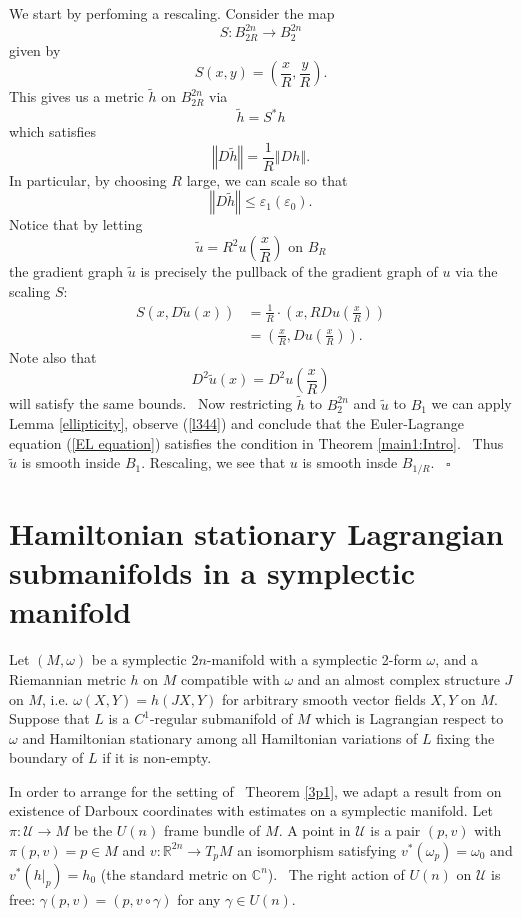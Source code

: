 \documentclass[12pt,leqno]{amsart}%
\providecommand{\U}[1]{\protect\rule{.1in}{.1in}}
\theoremstyle{plain}
\numberwithin{equation}{section}
\theoremstyle{definition}
\begin{document}
\proof We start by perfoming a rescaling. Consider the map%
\[
S:B_{2R}^{2n}\rightarrow B_{2}^{2n}%
\]
given by
\[
S\left(  x,y\right)  =\left(  \frac{x}{R},\frac{y}{R}\right)  .
\]
This gives us a metric $\tilde{h}$ on $B_{2R}^{2n}$ via
\[
\tilde{h}=S^{\ast}h
\]
which satisfies%
\[
\left\Vert D\tilde{h}\right\Vert =\frac{1}{R}\left\Vert Dh\right\Vert .
\]
In particular, by choosing $R$ large, we can scale so that
\[
\left\Vert D\tilde{h}\right\Vert \leq\varepsilon_{1}(\varepsilon_{0}).
\]
Notice that by letting
\[
\tilde{u}=R^{2}u\left(\frac{x}{R}\right)\text{ on }B_{R}%
\]
the gradient graph $\tilde{u}$ is precisely the pullback of the gradient
graph of $u$ via the scaling $S:$%
\begin{align*}
S\left(  x,D\tilde{u}(x)\right) &  =\frac{1}{R}\cdot\left(  x,RDu\left(\frac
{x}{R}\right)\right)  \\
&  =\left(  \frac{x}{R},Du\left(\frac{x}{R}\right)\right)  .
\end{align*}
Note also that
\begin{equation}
D^{2}\tilde{u}(x)=D^{2}u\left(  \frac{x}{R}\right)  \label{rescaleOK}%
\end{equation}
will satisfy the same bounds. \ Now restricting $\tilde{h}$ to $B_{2}^{2n}$
and $\tilde{u}$ to $B_{1}$ we can apply Lemma \ref{ellipticity}, observe
(\ref{l344}) and conclude that the Euler-Lagrange equation (\ref{EL equation})
satisfies the condition in Theorem \ref{main1:Intro}. \ Thus $\tilde{u}$ is
smooth inside $B_{1}.$ Rescaling, we see that $u$ is smooth insde $B_{1/R}.$ \
\hfill $\square$

\section{Hamiltonian stationary Lagrangian submanifolds in a symplectic
manifold}

\label{sec_ main}

Let $(M,\omega)$ be a symplectic $2n$-manifold with a symplectic 2-form
$\omega$, and a Riemannian metric $h$ on $M$ compatible with $\omega$ and an
almost complex structure $J$ on $M$, i.e. $\omega(X,Y)=h(JX,Y)$ for arbitrary
smooth vector fields $X,Y$ on $M$. Suppose that $L$ is a $C^{1}$-regular
submanifold of $M$ which is Lagrangian respect to $\omega$ and Hamiltonian
stationary among all Hamiltonian variations of $L$ fixing the boundary of $L$
if it is non-empty.

In order to arrange for the setting of \ Theorem \ref{3p1},  we adapt a result
from \cite[Prop. 3.2 and Prop. 3.4]{JLS} on existence of Darboux coordinates with
estimates on a symplectic manifold. Let $\pi:\mathcal{U}\rightarrow M$ be the
$U(n)$ frame bundle of $M$. A point in $\mathcal{U}$ is a pair $(p,v)$ with
$\pi(p,v)=p\in M$ and $v:\mathbb{R}^{2n}\rightarrow T_{p}M$ an isomorphism
satisfying $v^{\ast}(\omega_{p})=\omega_{0}$ and $v^{\ast}(h|_{p})=h_{0}$ (the
standard metric on $%
\mathbb{C}
^{n}$). \ The right action of $U(n)$ on  $\mathcal{U}$ is free: $\gamma
(p,v)=(p,v\circ\gamma)$ for any $\gamma\in U(n)$.
\end{document}
